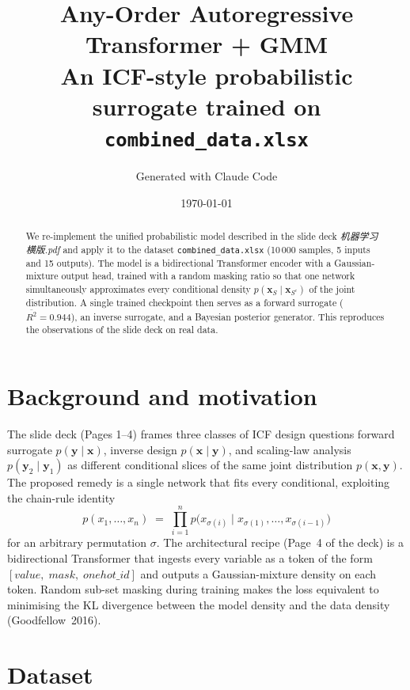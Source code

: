 \documentclass[11pt,a4paper]{article}
\title{\bfseries Any-Order Autoregressive Transformer + GMM\\[2pt]
       \large An ICF-style probabilistic surrogate trained on \texttt{combined\_data.xlsx}}
\author{Generated with Claude Code}
\date{\today}
\begin{document}
\maketitle

\begin{abstract}
We re-implement the unified probabilistic model described in the slide deck
\emph{机器学习横版.pdf} and apply it to the dataset \texttt{combined\_data.xlsx}
(10\,000 samples, 5 inputs and 15 outputs). The model is a bidirectional
Transformer encoder with a Gaussian-mixture output head, trained with a
random masking ratio so that one network simultaneously approximates every
conditional density $p(\mathbf{x}_{S}\mid\mathbf{x}_{S^{c}})$ of the joint
distribution. A single trained checkpoint then serves as a forward surrogate
($\overline{R^{2}}\!=\!0.944$), an inverse surrogate, and a Bayesian
posterior generator. This reproduces the observations of the slide deck on
real data.
\end{abstract}

\section{Background and motivation}

The slide deck (Pages 1--4) frames three classes of ICF design questions
\textemdash{} forward surrogate $p(\mathbf{y}\mid\mathbf{x})$, inverse design
$p(\mathbf{x}\mid\mathbf{y})$, and scaling-law analysis $p(\mathbf{y}_{2}\mid\mathbf{y}_{1})$
\textemdash{} as different conditional slices of the same joint distribution
$p(\mathbf{x},\mathbf{y})$. The proposed remedy is a single network that fits
every conditional, exploiting the chain-rule identity
\begin{equation}
  p(x_{1},\ldots,x_{n}) \;=\; \prod_{i=1}^{n} p\bigl(x_{\sigma(i)}\mid x_{\sigma(1)},\ldots,x_{\sigma(i-1)}\bigr)
  \label{eq:chain}
\end{equation}
for an arbitrary permutation $\sigma$. The architectural recipe (Page~4 of the deck)
is a bidirectional Transformer that ingests every variable as a token of the form
$[\mathit{value},\;\mathit{mask},\;\mathit{onehot\_id}]$ and outputs a
Gaussian-mixture density on each token. Random sub-set masking during training
makes the loss equivalent to minimising the KL divergence between the model
density and the data density (Goodfellow~2016).

\section{Dataset}
\end{document}

